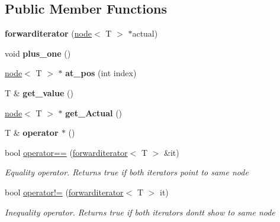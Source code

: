 \subsection*{Public Member Functions}
\begin{DoxyCompactItemize}
\item 
\mbox{\label{classforwarditerator_a9b8b2376cd4ac3fd12302b1edc52026f}} 
{\bfseries forwarditerator} (\mbox{\hyperlink{classnode}{node}}$<$ T $>$ $\ast$actual)
\item 
\mbox{\label{classforwarditerator_a976392a8574122f1129abafc2b4088f1}} 
void {\bfseries plus\+\_\+one} ()
\item 
\mbox{\label{classforwarditerator_ada00f7f88cba9ea0d9f6a2190bbb15cc}} 
\mbox{\hyperlink{classnode}{node}}$<$ T $>$ $\ast$ {\bfseries at\+\_\+pos} (int index)
\item 
\mbox{\label{classforwarditerator_a504c6128df3a710f7836813e05ee0c97}} 
T \& {\bfseries get\+\_\+value} ()
\item 
\mbox{\label{classforwarditerator_a5b38d917507c92774b1eb5f14d2d00e1}} 
\mbox{\hyperlink{classnode}{node}}$<$ T $>$ $\ast$ {\bfseries get\+\_\+\+Actual} ()
\item 
\mbox{\label{classforwarditerator_ac4ee076a6aae9d8988a4a1c704e5d578}} 
T \& {\bfseries operator $\ast$} ()
\item 
bool \mbox{\hyperlink{classforwarditerator_ab19bc229f24b7682e7faf96c8cebcd27}{operator==}} (\mbox{\hyperlink{classforwarditerator}{forwarditerator}}$<$ T $>$ \&it)
\begin{DoxyCompactList}\small\item\em Equality operator. Returns true if both iterators point to same node \end{DoxyCompactList}\item 
bool \mbox{\hyperlink{classforwarditerator_a01a4fa4d5611a1b141ff21f5b513391a}{operator!=}} (\mbox{\hyperlink{classforwarditerator}{forwarditerator}}$<$ T $>$ it)
\begin{DoxyCompactList}\small\item\em Inequality operator. Returns true if both iterators dont\textquotesingle{}t show to same node \end{DoxyCompactList}\item 

\end{DoxyCompactItemize}
